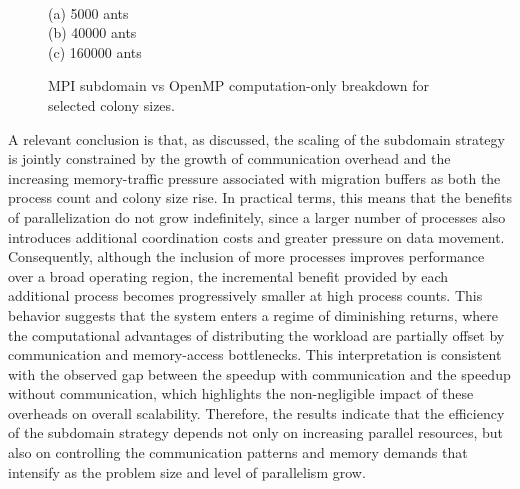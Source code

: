 \begin{figure}[!htbp]
\centering
{}
\\[-2mm]
{\footnotesize (a) 5000 ants}
\vspace{1mm}
\\[-2mm]
{\footnotesize (b) 40000 ants}
\vspace{1mm}
\\[-2mm]
{\footnotesize (c) 160000 ants}
\caption{MPI subdomain vs OpenMP computation-only breakdown for selected colony sizes.}
\label{fig:mpi_vs_omp_calc_selected}
\end{figure}

A relevant conclusion is that, as discussed, the scaling of the subdomain strategy is jointly constrained by the growth of communication overhead and the increasing memory-traffic pressure associated with migration buffers as both the process count and colony size rise. In practical terms, this means that the benefits of parallelization do not grow indefinitely, since a larger number of processes also introduces additional coordination costs and greater pressure on data movement. Consequently, although the inclusion of more processes improves performance over a broad operating region, the incremental benefit provided by each additional process becomes progressively smaller at high process counts. This behavior suggests that the system enters a regime of diminishing returns, where the computational advantages of distributing the workload are partially offset by communication and memory-access bottlenecks. This interpretation is consistent with the observed gap between the speedup with communication and the speedup without communication, which highlights the non-negligible impact of these overheads on overall scalability. Therefore, the results indicate that the efficiency of the subdomain strategy depends not only on increasing parallel resources, but also on controlling the communication patterns and memory demands that intensify as the problem size and level of parallelism grow.

